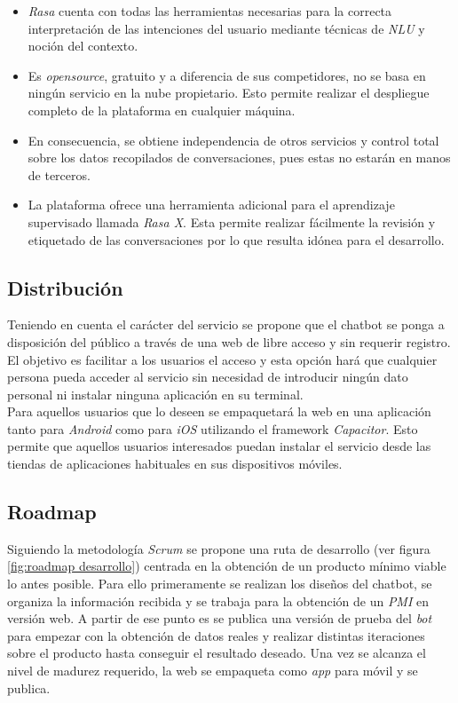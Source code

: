 \begin{itemize}
	\item \textit{Rasa} cuenta con todas las herramientas necesarias para la correcta interpretación de las intenciones del usuario mediante técnicas de \textit{NLU} y noción del contexto.
	\item Es \textit{opensource}, gratuito y a diferencia de sus competidores, no se basa en ningún servicio en la nube propietario. Esto permite realizar el despliegue completo de la plataforma en cualquier máquina. 
	\item  En consecuencia, se obtiene independencia de otros servicios y control total sobre los datos recopilados de conversaciones, pues estas no estarán en manos de terceros.
	\item La plataforma ofrece una herramienta adicional para el aprendizaje supervisado llamada \textit{Rasa X}. Esta permite realizar fácilmente la revisión y etiquetado de las conversaciones por lo que resulta idónea para el desarrollo.
\end{itemize}	

\subsection{Distribución}
Teniendo en cuenta el carácter del servicio se propone que el chatbot se ponga a disposición del público a través de una web de libre acceso y sin requerir registro. El objetivo es facilitar a los usuarios el acceso  y esta opción hará que cualquier persona pueda acceder al servicio sin necesidad de introducir ningún dato personal ni instalar ninguna aplicación en su terminal. \\

Para aquellos usuarios que lo deseen se empaquetará la web en una aplicación tanto para \textit{Android} como para \textit{iOS} utilizando el framework \textit{Capacitor}. Esto permite que aquellos usuarios interesados puedan instalar el servicio desde las tiendas de aplicaciones habituales en sus dispositivos móviles.\\

\subsection{Roadmap}
Siguiendo la metodología \textit{Scrum} se propone una ruta de desarrollo (ver figura \ref{fig:roadmap desarrollo}) centrada en la obtención de un producto mínimo viable lo antes posible. Para ello primeramente se realizan los diseños del chatbot, se organiza la información recibida y se trabaja para la obtención de un \textit{PMI} en versión web. A partir de ese punto es se publica una versión de prueba del \textit{bot} para empezar con la obtención de datos reales  y realizar distintas iteraciones sobre el producto hasta conseguir el resultado deseado. Una vez se alcanza el nivel de madurez requerido, la web se empaqueta como \textit{app} para móvil y se publica.\\

